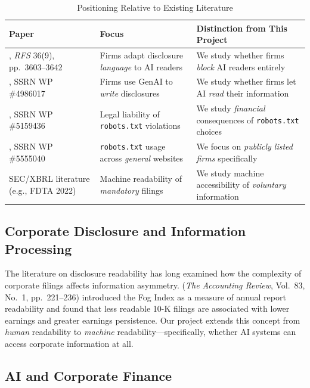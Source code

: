 \documentclass[12pt,a4paper]{article}
\begin{document}
\begin{table}[htbp]
\centering
\caption{Positioning Relative to Existing Literature}
\label{tab:positioning}
\small
\begin{tabular}{p{4.5cm}p{3.5cm}p{5cm}}
\toprule
\textbf{Paper} & \textbf{Focus} & \textbf{Distinction from This Project} \\
\midrule
\citet{CaoJiangYangZhang2023}, \emph{RFS} 36(9), pp.\ 3603--3642 & Firms adapt disclosure \emph{language} to AI readers & We study whether firms \emph{block} AI readers entirely \\
\addlinespace
\citet{BlankespoorDeHaanLi2024}, SSRN WP \#4986017 & Firms use GenAI to \emph{write} disclosures & We study whether firms let AI \emph{read} their information \\
\addlinespace
\citet{ChangHe2025}, SSRN WP \#5159436 & Legal liability of \texttt{robots.txt} violations & We study \emph{financial} consequences of \texttt{robots.txt} choices \\
\addlinespace
\citet{Reitinger2025}, SSRN WP \#5555040 & \texttt{robots.txt} usage across \emph{general} websites & We focus on \emph{publicly listed firms} specifically \\
\addlinespace
SEC/XBRL literature (e.g., FDTA 2022) & Machine readability of \emph{mandatory} filings & We study machine accessibility of \emph{voluntary} information \\
\bottomrule
\end{tabular}
\end{table}

\subsection{Corporate Disclosure and Information Processing}

The literature on disclosure readability has long examined how the complexity of corporate filings affects information asymmetry. \citet{Li2008} (\emph{The Accounting Review}, Vol.\ 83, No.\ 1, pp.\ 221--236) introduced the Fog Index as a measure of annual report readability and found that less readable 10-K filings are associated with lower earnings and greater earnings persistence. Our project extends this concept from \emph{human} readability to \emph{machine} readability---specifically, whether AI systems can access corporate information at all.

\subsection{AI and Corporate Finance}
\end{document}
